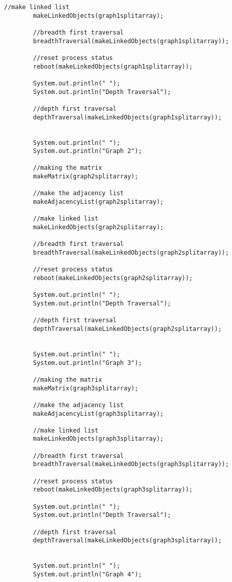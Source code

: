 \documentclass[letterpaper, 10pt,DIV=13]{scrartcl}
\numberwithin{equation}{section} %
\numberwithin{figure}{section} %
\numberwithin{table}{section} %
\begin{document}
\begin{lstlisting}[frame=single, ]
        //make linked list
        makeLinkedObjects(graph1splitarray);

        //breadth first traversal
        breadthTraversal(makeLinkedObjects(graph1splitarray));

        //reset process status
        reboot(makeLinkedObjects(graph1splitarray));

        System.out.println(" ");
        System.out.println("Depth Traversal");

        //depth first traversal
        depthTraversal(makeLinkedObjects(graph1splitarray));


        System.out.println(" ");
        System.out.println("Graph 2");

        //making the matrix
        makeMatrix(graph2splitarray);

        //make the adjacency list
        makeAdjacencyList(graph2splitarray);

        //make linked list
        makeLinkedObjects(graph2splitarray);

        //breadth first traversal
        breadthTraversal(makeLinkedObjects(graph2splitarray));

        //reset process status
        reboot(makeLinkedObjects(graph2splitarray));

        System.out.println(" ");
        System.out.println("Depth Traversal");

        //depth first traversal
        depthTraversal(makeLinkedObjects(graph2splitarray));


        System.out.println(" ");
        System.out.println("Graph 3");

        //making the matrix
        makeMatrix(graph3splitarray);

        //make the adjacency list
        makeAdjacencyList(graph3splitarray);

        //make linked list
        makeLinkedObjects(graph3splitarray);

        //breadth first traversal
        breadthTraversal(makeLinkedObjects(graph3splitarray));

        //reset process status
        reboot(makeLinkedObjects(graph3splitarray));

        System.out.println(" ");
        System.out.println("Depth Traversal");

        //depth first traversal
        depthTraversal(makeLinkedObjects(graph3splitarray));


        System.out.println(" ");
        System.out.println("Graph 4");


\end{lstlisting}
\end{document}

